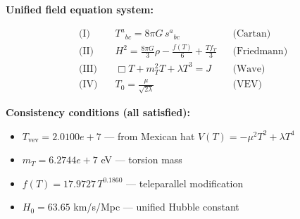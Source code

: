 
\textbf{Unified field equation system:}

\begin{align}
  \text{(I)} \quad & T^a{}_{bc} = 8\pi G \, s^a{}_{bc} && \text{(Cartan)} \\
  \text{(II)} \quad & H^2 = \frac{8\pi G}{3}\rho - \frac{f(T)}{6} + \frac{Tf_T}{3} && \text{(Friedmann)} \\
  \text{(III)} \quad & \Box T + m_T^2 T + \lambda T^3 = J && \text{(Wave)} \\
  \text{(IV)} \quad & T_0 = \frac{\mu}{\sqrt{2\lambda}} && \text{(VEV)}
\end{align}

\textbf{Consistency conditions (all satisfied):}
\begin{itemize}
  \item $T_{\text{vev}} = 2.0100e+7$ — from Mexican hat $V(T) = -\mu^2 T^2 + \lambda T^4$
  \item $m_T = 6.2744e+7$ eV — torsion mass
  \item $f(T) = 17.9727 \, T^{0.1860}$ — teleparallel modification
  \item $H_0 = 63.65$ km/s/Mpc — unified Hubble constant
\end{itemize}